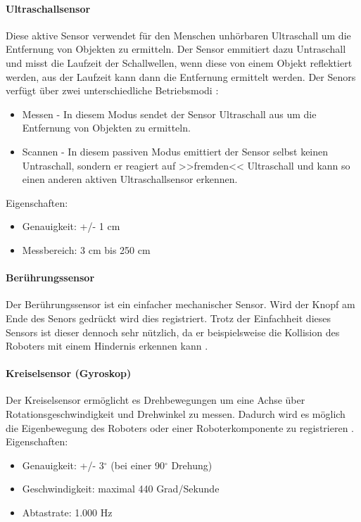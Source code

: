 \paragraph{Ultraschallsensor}
\color{finishing}
Diese aktive Sensor verwendet für den Menschen unhörbaren Ultraschall um die Entfernung von Objekten zu ermitteln.
Der Sensor emmitiert dazu Untraschall und misst die Laufzeit der Schallwellen, wenn diese von einem Objekt reflektiert
werden, aus der Laufzeit kann dann die Entfernung ermittelt werden.
Der Senors verfügt über zwei unterschiedliche Betriebsmodi \cite[vgl.][32 f.]{Scholz.DasEV3}:
\begin{itemize}
	\item{Messen} - In diesem Modus sendet der Sensor Ultraschall aus um die Entfernung von Objekten zu ermitteln.
	\item{Scannen} - In diesem passiven Modus emittiert der Sensor selbst keinen Untraschall, sondern er reagiert auf >>fremden<< Ultraschall und kann so einen anderen aktiven Ultraschallsensor erkennen.
\end{itemize}
\smallskip
Eigenschaften:
\begin{itemize}
	\item{Genauigkeit: +/- 1 cm}
	\item{Messbereich: 3 cm bis 250 cm}
\end{itemize}
\paragraph{Berührungssensor}
\color{finishing}
Der Berührungssensor ist ein einfacher mechanischer Sensor. Wird der Knopf am Ende des Senors gedrückt wird dies
registriert. Trotz der Einfachheit dieses Sensors ist dieser dennoch sehr nützlich, da er beispielsweise die
Kollision des Roboters mit einem Hindernis erkennen kann \cite[vgl.][33]{Scholz.DasEV3}.
\paragraph{Kreiselsensor (Gyroskop)}
\color{finishing}
Der Kreiselsensor ermöglicht es Drehbewegungen um eine Achse über Rotationsgeschwindigkeit und Drehwinkel zu 
messen. Dadurch wird es möglich die Eigenbewegung des Roboters oder einer Roboterkomponente zu registrieren 
\cite[vgl.][33]{Scholz.DasEV3}.
\medskip
\newline
Eigenschaften:
\begin{itemize}
	\item{Genauigkeit: +/- 3$^\circ$ (bei einer 90$^\circ$ Drehung)}
	\item{Geschwindigkeit: maximal 440 Grad/Sekunde}
	\item{Abtastrate: 1.000 Hz}
\end{itemize}

